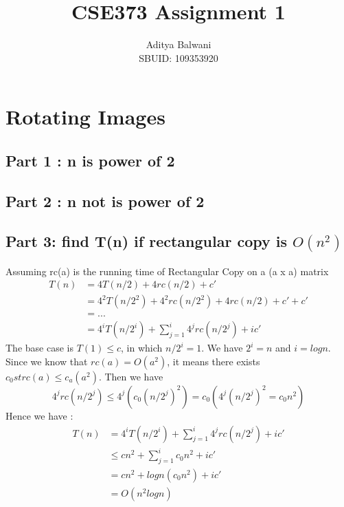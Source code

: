 \documentclass{article}
\title{\textbf{CSE373 Assignment 1}}
\author{Aditya Balwani\\SBUID: 109353920}
\begin{document}
\maketitle
{}
\section{Rotating Images}
	\subsection{Part 1 : n is power of 2}
	

	\subsection{Part 2 : n not is power of 2}
    

    \subsection{Part 3: find T(n) if rectangular copy is $O(n^2)$}
    Assuming rc(a) is the running time of Rectangular Copy on a (a x a) matrix
        \begin{align*}
            T(n) &= 4T(n/2) + 4rc(n/2) + c'\\
            &= 4^2T(n/2^2) + 4^2rc(n/2^2) + 4rc(n/2) + c' + c'\\
            &= ... \\
            &= 4^iT(n/2^i) + \sum_{j=1}^{i}4^jrc(n/2^j) + ic'
        \end{align*}
        The base case is $T(1) \leq c$, in which $n/2^i = 1$. We have $2^i = n$ and $i = log n$. Since we know that $rc(a) = O(a^2)$, it means there exists $c_0 st rc(a) \leq c_a(a^2)$. Then we have
        \[4^jrc(n/2^j) \leq 4^j(c_0(n/2^j)^2) = c_0(4^j(n/2^j)^2 = c_0n^2)\]
        Hence we have :
        \begin{align*}
            T(n) &= 4^iT(n/2^i) + \sum_{j=1}^{i}4^jrc(n/2^j) + ic'\\
            &\leq cn^2 + \sum_{j=1}^{i}c_0n^2 + ic'\\
            &= cn^2 + log n(c_0n^2) + ic'\\
            &=O(n^2log n)\\
        \end{align*}
\end{document}
